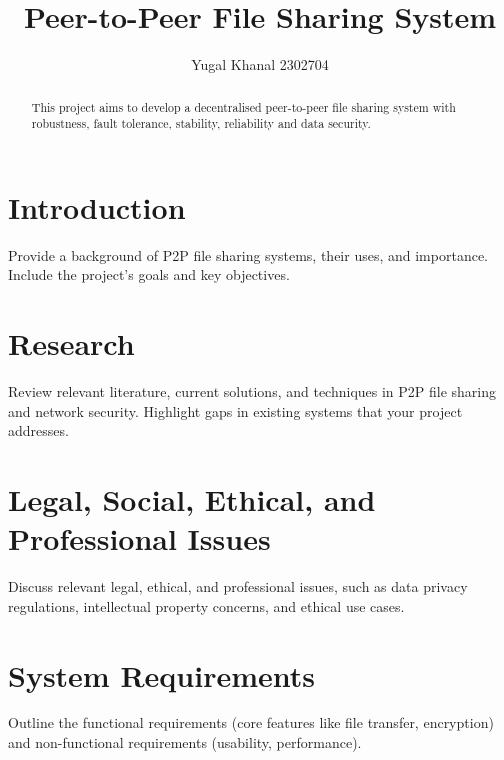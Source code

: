 \documentclass[12pt,a4paper]{report}
\title{Peer-to-Peer File Sharing System}
\author{Yugal Khanal 2302704}
\date{}
\begin{document}
\maketitle

\begin{abstract}

    This project aims to develop a decentralised peer-to-peer file sharing system with robustness, fault tolerance, stability, reliability and data security.
\end{abstract}

\tableofcontents
\newpage

\chapter{Introduction}
    Provide a background of P2P file sharing systems, their uses, and importance. Include the project’s goals and key objectives.

\chapter{Research}
    Review relevant literature, current solutions, and techniques in P2P file sharing and network security. Highlight gaps in existing systems that your project addresses.

\chapter{Legal, Social, Ethical, and Professional Issues}
    Discuss relevant legal, ethical, and professional issues, such as data privacy regulations, intellectual property concerns, and ethical use cases.


\chapter{System Requirements}
    Outline the functional requirements (core features like file transfer, encryption) and non-functional requirements (usability, performance).
\end{document}
